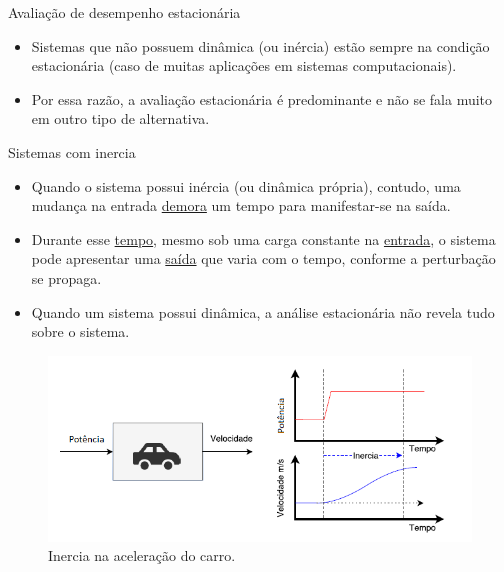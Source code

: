 \begin{frame}{Avaliação de desempenho estacionária}
	\begin{itemize}
		\item Sistemas que não possuem dinâmica (ou inércia) estão sempre na condição estacionária (caso de muitas aplicações em sistemas computacionais).  
		\item Por essa razão, a avaliação estacionária é predominante e não se fala muito em outro tipo de alternativa.
	\end{itemize}
\end{frame}

\begin{frame}{Sistemas com inercia}
	\begin{itemize}
		\item Quando o sistema possui inércia (ou dinâmica própria), contudo, uma mudança na entrada \underline{demora} um tempo para manifestar-se na saída. 
		\item Durante esse \underline{tempo}, mesmo sob uma carga constante na \underline{entrada}, o sistema pode apresentar uma \underline{saída} que varia com o tempo, conforme a perturbação se propaga.  
		\item Quando um sistema possui dinâmica, a análise estacionária não revela tudo sobre o sistema. 
	\end{itemize}
	
	\begin{figure}
		\centering
		\includegraphics[scale=.4]{images/car-pt-crop.png}
		\caption{Inercia na aceleração do carro.}
		
	\end{figure}
\end{frame}

